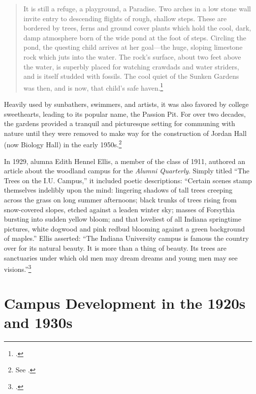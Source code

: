 \documentclass[
  american,
  letterpaper,
]{scrreprt}
\begin{document}
\begin{quote}
It is still a refuge, a playground, a Paradise. Two arches in a low
stone wall invite entry to descending flights of rough, shallow steps.
These are bordered by trees, ferns and ground cover plants which hold
the cool, dark, damp atmosphere born of the wide pond at the foot of
steps. Circling the pond, the questing child arrives at her goal---the
huge, sloping limestone rock which juts into the water. The rock's
surface, about two feet above the water, is superbly placed for watching
crawdads and water striders, and is itself studded with fossils. The
cool quiet of the Sunken Gardens was then, and is now, that child's safe
haven.\footnote{.}
\end{quote}

Heavily used by sunbathers, swimmers, and artists, it was also favored
by college sweethearts, leading to its popular name, the Passion Pit.
For over two decades, the gardens provided a tranquil and picturesque
setting for communing with nature until they were removed to make way
for the construction of Jordan Hall (now Biology Hall) in the early
1950s.\footnote{See .}

In 1929, alumna Edith Hennel Ellis, a member of the class of 1911,
authored an article about the woodland campus for the \emph{Alumni
Quarterly}. Simply titled ``The Trees on the I.U. Campus,'' it included
poetic descriptions: ``Certain scenes stamp themselves indelibly upon
the mind: lingering shadows of tall trees creeping across the grass on
long summer afternoons; black trunks of trees rising from snow-covered
slopes, etched against a leaden winter sky; masses of Forsythia bursting
into sudden yellow bloom; and that loveliest of all Indiana springtime
pictures, white dogwood and pink redbud blooming against a green
background of maples.'' Ellis asserted: ``The Indiana University campus
is famous the country over for its natural beauty. It is more than a
thing of beauty. Its trees are sanctuaries under which old men may dream
dreams and young men may see visions.''\footnote{.}

\section{Campus Development in the 1920s and
1930s}\label{campus-development-in-the-1920s-and-1930s}
\end{document}
